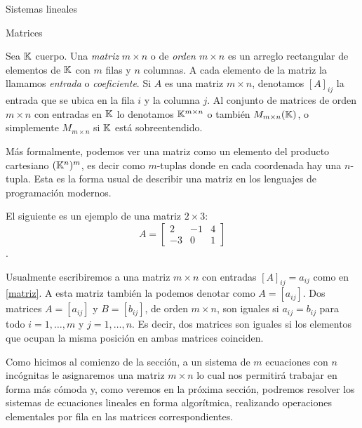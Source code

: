 \begin{chapter}{Sistemas lineales}
\begin{section}{Matrices}
            
            \begin{definicion} Sea $\mathbb K$ cuerpo. Una \textit{matriz} $m \times  n$ o de \textit{orden $m \times  n$} es un arreglo rectangular de elementos de $\mathbb K$ con $m$ filas y $n$ columnas. A cada elemento de la matriz la llamamos \textit{entrada} o \textit{coeficiente}. Si $A$ es una matriz $m \times  n$, denotamos $[A]_{ij}$ la entrada que se ubica en la fila $i$ y la columna $j$. Al conjunto de matrices de orden $m \times  n$ con entradas en $\mathbb K$ lo denotamos $\mathbb K^{m \times n}$ o también $M_{m\times n}(\mathbb K)$, o simplemente $M_{m\times n}$ si $\mathbb K$  está sobreentendido. 
            \end{definicion}
            
            \begin{observacion*}
                Más formalmente, podemos ver una matriz como un elemento del producto cartesiano $(\mathbb K^n)^m$, es decir como $m$-tuplas donde en cada coordenada hay una $n$-tupla. Esta es la forma usual de describir una matriz en los lenguajes de programación modernos. 
            \end{observacion*}
            
            \begin{ejemplo*}
                El siguiente es un ejemplo de una matriz $2 \times 3$:
                \begin{equation*}
                A = \begin{bmatrix}
                2& -1& 4 \\
                -3 &0&1
                \end{bmatrix}
                \end{equation*} .
            \end{ejemplo*}
            
            Usualmente escribiremos a una matriz $m \times  n$   con entradas  $[A]_{ij} = a_{ij}$ como en \eqref{matriz}. A esta matriz también la podemos denotar como $A = [a_{ij}]$. Dos matrices $A = [a_{ij}]$ y $B = [b_{ij}]$, de orden $m \times n$, son iguales si $a_{ij} = b_{ij}$ para todo $i = 1,\ldots,m$  y $j = 1,\ldots,n$. Es decir, dos matrices son iguales si los elementos que ocupan la misma posición en ambas matrices coinciden.
            
            Como hicimos al comienzo de la sección, a un sistema de $m$ ecuaciones con $n$ incógnitas le asignaremos una matriz $m \times  n$  lo cual nos permitirá trabajar en forma más cómoda y, como veremos en la próxima sección,  podremos resolver los sistemas de ecuaciones lineales en forma algorítmica, realizando operaciones elementales por fila en las matrices correspondientes. 
            

\end{section}
\end{chapter}

